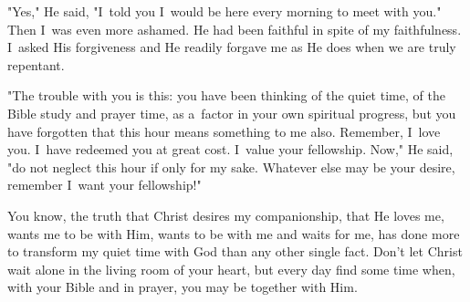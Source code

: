 \documentclass[a4paper,12pt]{article}
\begin{document}
\begin{multicols}{2}
"Yes," He said, "I~told you I~would be here every morning to meet with you." Then I~was even more ashamed. He had been faithful in spite of my faithfulness. I~asked His forgiveness and He readily forgave me as He does when we are truly repentant. 

"The trouble with you is this: you have been thinking of the quiet time, of the Bible study and prayer time, as a~factor in your own spiritual progress, but you have forgotten that this hour means something to me also. Remember, I~love you. I~have redeemed you at great cost. I~value your fellowship. Now," He said, "do not neglect this hour if only for my sake. Whatever else may be your desire, remember I~want your fellowship!" 

You know, the truth that Christ desires my companionship, that He loves me, wants me to be with Him, wants to be with me and waits for me, has done more to transform my quiet time with God than any other single fact. Don't let Christ wait alone in the living room of your heart, but every day find some time when, with your Bible and in prayer, you may be together with Him. 
\end{multicols}
\end{document}
